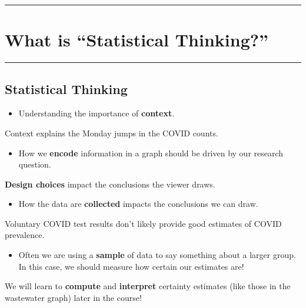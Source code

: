 \documentclass[
  letterpaper,
  DIV=11,
  numbers=noendperiod]{scrartcl}
\providecommand{\tightlist}{%
  \setlength{\itemsep}{0pt}\setlength{\parskip}{0pt}}\usepackage{longtable,booktabs,array}
\begin{document}
\begin{center}\rule{0.5\linewidth}{0.5pt}\end{center}

\hypertarget{what-is-statistical-thinking}{%
\section{What is ``Statistical
Thinking?''}\label{what-is-statistical-thinking}}

\begin{center}\rule{0.5\linewidth}{0.5pt}\end{center}

\hypertarget{statistical-thinking}{%
\subsection{Statistical Thinking}\label{statistical-thinking}}

\begin{itemize}
\tightlist
\item
  Understanding the importance of \textbf{context}.
\end{itemize}

 Context explains the Monday jumps in the COVID
counts.

\begin{itemize}
\tightlist
\item
  How we \textbf{encode} information in a graph should be driven by our
  research question.
\end{itemize}

 \textbf{Design choices} impact the conclusions the
viewer draws.

\begin{itemize}
\tightlist
\item
  How the data are \textbf{collected} impacts the conclusions we can
  draw.
\end{itemize}

 Voluntary COVID test results don't likely provide
good estimates of COVID prevalence.

\begin{itemize}
\tightlist
\item
  Often we are using a \textbf{sample} of data to say something about a
  larger group. In this case, we should measure how certain our
  estimates are!
\end{itemize}

 We will learn to \textbf{compute} and
\textbf{interpret} certainty estimates (like those in the wastewater
graph) later in the course!
\end{document}
